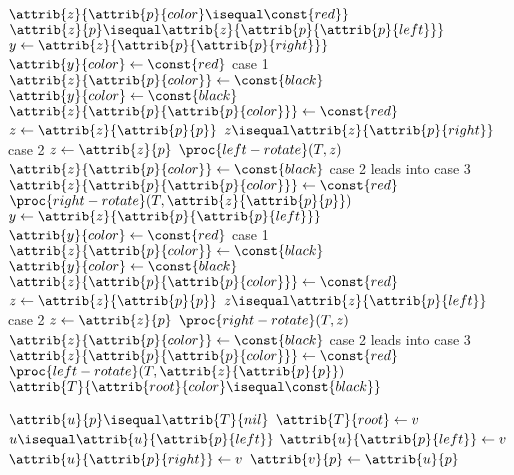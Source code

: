 \documentclass[12pt]{article}
\begin{document}
\begin{codebox}
\li \While $\attrib{z}{\attrib{p}{color} \isequal \const{red}}$
    \Do
\li     \If $\attrib{z}{p} \isequal \attrib{z}{\attrib{p}{\attrib{p}{left}}}$
\li     \Then
            $y \gets{\attrib{z}{\attrib{p}{\attrib{p}{right}}}}$
\li         \If $\attrib{y}{color} \gets{\const{red}}$ \Comment case 1
\li         \Then
                $\attrib{z}{\attrib{p}{color}} \gets{\const{black}}$
\li             $\attrib{y}{color} \gets{\const{black}}$
\li             $\attrib{z}{\attrib{p}{\attrib{p}{color}}} \gets{\const{red}}$
\li             $z \gets{\attrib{z}{\attrib{p}{p}}}$
\li         \Else
\li             \If $z \isequal \attrib{z}{\attrib{p}{right}}$ \Comment case 2
\li             \Then
                    $z \gets{\attrib{z}{p}}$
\li                 $\proc{left-rotate}(T, z)$
                \End
\li             $\attrib{z}{\attrib{p}{color}}
\gets{\const{black}}$ \Comment case 2 leads into case 3
\li             $\attrib{z}{\attrib{p}{\attrib{p}{color}}} \gets{\const{red}}$
\li             $\proc{right-rotate}(T, \attrib{z}{\attrib{p}{p}})$
            \End
\li     \Else
\li         $y \gets{\attrib{z}{\attrib{p}{\attrib{p}{left}}}}$
\li         \If $\attrib{y}{color} \gets{\const{red}}$ \Comment case 1
\li         \Then
                $\attrib{z}{\attrib{p}{color}} \gets{\const{black}}$
\li             $\attrib{y}{color} \gets{\const{black}}$
\li             $\attrib{z}{\attrib{p}{\attrib{p}{color}}} \gets{\const{red}}$
\li             $z \gets{\attrib{z}{\attrib{p}{p}}}$
\li         \Else
\li             \If $z \isequal \attrib{z}{\attrib{p}{left}}$ \Comment case 2
\li             \Then
                    $z \gets{\attrib{z}{p}}$
\li                 $\proc{right-rotate}(T, z)$
                \End
\li             $\attrib{z}{\attrib{p}{color}} \gets{\const{black}}$ \Comment case 2 leads into case 3
\li             $\attrib{z}{\attrib{p}{\attrib{p}{color}}} \gets{\const{red}}$
\li             $\proc{left-rotate}(T, \attrib{z}{\attrib{p}{p}})$
            \End
        \End
    \End
\li $\attrib{T}{\attrib{root}{color} \isequal \const{black}}$
\end{codebox}

\begin{codebox}
\li \If $\attrib{u}{p} \isequal \attrib{T}{nil}$
\li \Then
        $\attrib{T}{root} \gets{v}$
\li \ElseIf $u \isequal \attrib{u}{\attrib{p}{left}}$
\li \Then
        $\attrib{u}{\attrib{p}{left}} \gets{v}$
\li \Else
\li     $\attrib{u}{\attrib{p}{right}} \gets{v}$
    \End
\li $\attrib{v}{p} \gets{\attrib{u}{p}}$
\end{codebox}
\end{document}
